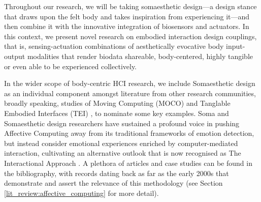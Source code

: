 Throughout our research, we will be taking somaesthetic design—a design stance that draws upon the felt body and takes inspiration from experiencing it—and then combine it with the innovative integration of biosensors and actuators. In this context, we present novel research on embodied interaction design couplings, that is, sensing-actuation combinations of aesthetically evocative body input-output modalities that render biodata shareable, body-centered, highly tangible or even able to be experienced collectively.

In the wider scope of body-centric HCI research, we include Somaesthetic design as an individual component amongst literature from other research communities, broadly speaking, studies of Moving Computing (MOCO) \cite{zhou_dance_2021} and Tanglable Embodied Interfaces (TEI) \cite{li_meta-analysis_2022}, to nominate some key examples. Soma and Somaesthetic design researchers have sustained a profound voice in pushing Affective Computing away from its traditional frameworks of emotion detection, but instead consider emotional experiences enriched by computer-mediated interaction, cultivating an alternative outlook that is now recognised as The Interactional Approach \citep{hook_affective_2009}. A plethora of articles and case studies can be found in the bibliography, with records dating back as far as the early 2000s that demonstrate and assert the relevance of this methodology (see Section \ref{lit_review:affective_computing} for more detail).




